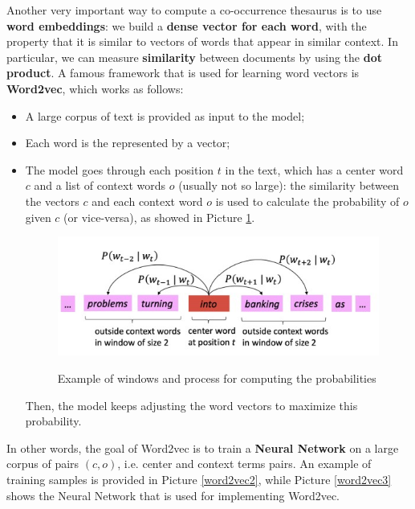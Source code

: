 Another very important way to compute a co-occurrence thesaurus is to use \textbf{word embeddings}: we build a \textbf{dense vector for each word}, with the property that it is similar to vectors of words that appear in similar context. In particular, we can measure \textbf{similarity} between documents by using the \textbf{dot product}. A famous framework that is used for learning word vectors is \textbf{Word2vec}, which works as follows:

\begin{itemize}
    \item A large corpus of text is provided as input to the model;
    \item Each word is the represented by a vector;
    \item The model goes through each position $t$ in the text, which has a center word $c$ and a list of context words $o$ (usually not so large): the similarity between the vectors $c$ and each context word $o$ is used to calculate the probability of $o$ given $c$ (or vice-versa), as showed in Picture \ref{word2vec}. 

    \begin{figure}[h!]
		\centering
		\includegraphics[scale = 2.0]{img/word2vec.jpg}
		\label{word2vec}
        \caption{Example of windows and process for computing the probabilities}
    \end{figure}
    
    Then, the model keeps adjusting the word vectors to maximize this probability.
\end{itemize}

In other words, the goal of Word2vec is to train a \textbf{Neural Network} on a large corpus of pairs $(c,o)$, i.e. center and context terms pairs. An example of training samples is provided in Picture \ref{word2vec2}, while Picture \ref{word2vec3} shows the Neural Network that is used for implementing Word2vec.

